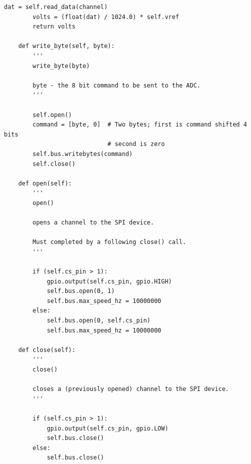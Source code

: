 \documentclass[twoside,a4]{report}
\begin{document}
\begin{Verbatim}[frame=single,fontsize=\footnotesize]
		dat = self.read_data(channel)
		volts = (float(dat) / 1024.0) * self.vref
		return volts
	
	def write_byte(self, byte):
		'''
		write_byte(byte)
		
		byte - the 8 bit command to be sent to the ADC.
		'''
		
		self.open()
		command = [byte, 0]  # Two bytes; first is command shifted 4 bits
		                     # second is zero
		self.bus.writebytes(command)
		self.close()
	
	def open(self):
		'''
		open()
		
		opens a channel to the SPI device.
		
		Must completed by a following close() call.
		'''
		
		if (self.cs_pin > 1):
			gpio.output(self.cs_pin, gpio.HIGH)
			self.bus.open(0, 1)
			self.bus.max_speed_hz = 10000000
		else:
			self.bus.open(0, self.cs_pin)
			self.bus.max_speed_hz = 10000000
	
	def close(self):
		'''
		close()
		
		closes a (previously opened) channel to the SPI device.
		'''
		
		if (self.cs_pin > 1):
			gpio.output(self.cs_pin, gpio.LOW)
			self.bus.close()
		else:
			self.bus.close()
\end{Verbatim}
\end{document}
